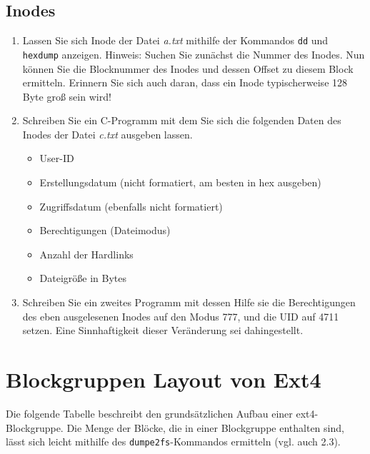 \documentclass[11pt,a4paper]{article}
\def\inlinebash{\lstinline[style=bash]}
\begin{document}
\subsection{Inodes}
\begin{enumerate}
	\item Lassen Sie sich Inode der Datei \emph{a.txt} mithilfe der Kommandos \inlinebash$dd$
		und \inlinebash$hexdump$ anzeigen. Hinweis: Suchen Sie zunächst die Nummer des Inodes.
		Nun können Sie die Blocknummer des Inodes und dessen Offset zu diesem Block ermitteln.
		Erinnern Sie sich auch daran, dass ein Inode typischerweise 128 Byte groß sein wird!
	\item Schreiben Sie ein C-Programm mit dem Sie sich die folgenden Daten
		des Inodes der Datei \emph{c.txt} ausgeben lassen.
		\begin{itemize}
			\item User-ID
			\item Erstellungsdatum (nicht formatiert, am besten in hex ausgeben)
			\item Zugriffsdatum (ebenfalls nicht formatiert)
			\item Berechtigungen (Dateimodus)
			\item Anzahl der Hardlinks
			\item Dateigröße in Bytes
		\end{itemize}
		
	\item Schreiben Sie ein zweites Programm mit dessen Hilfe sie die 
		Berechtigungen des eben ausgelesenen Inodes auf den Modus 777, 
		und die UID auf 4711 setzen.
		Eine Sinnhaftigkeit dieser Veränderung sei dahingestellt.
\end{enumerate}

\section{Blockgruppen Layout von Ext4}
Die folgende Tabelle beschreibt den grundsätzlichen Aufbau einer ext4-Blockgruppe.
Die Menge der Blöcke, die in einer Blockgruppe enthalten sind, lässt sich leicht
mithilfe des \inlinebash$dumpe2fs$-Kommandos ermitteln (vgl. auch 2.3).
\paragraph{}
\end{document}
